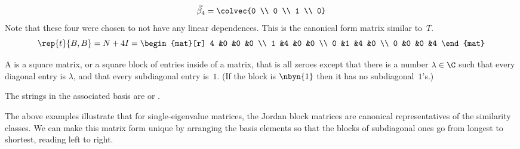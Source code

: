 \begin{example}
\begin{equation*}
  \vec{\beta}_4=\colvec{0 \\ 0 \\ 1 \\ 0}
\end{equation*}
Note that these four were chosen to not have any linear dependences.
This is the canonical form matrix similar to~$T$.
\begin{equation*}
  \rep{t}{B,B}
  =N+4I=
  \begin{mat}[r]
    4  &0  &0  &0   \\
    1  &4  &0  &0   \\
    0  &1  &4  &0   \\
    0  &0  &0  &4
   \end{mat}
\end{equation*}
\end{example}

\begin{definition}  \label{def:JordanBlock}
A 
is a square matrix, or a square block of entries inside of a matrix,
that is all zeroes except that 
there is a number $\lambda\in\C$ such that 
every diagonal entry is $\lambda$,
and that every subdiagonal entry is~$1$.
(If the block is $\nbyn{1}$ then it has no subdiagonal~$1$'s.)
\end{definition}

The strings in the associated basis are 
or .

The above examples illustrate that for single-eigenvalue
matrices, the 
Jordan block matrices are
canonical representatives of the similarity classes.
We can make this matrix form unique by
arranging the basis elements so that the blocks of subdiagonal ones go from
longest to shortest, reading left to right.

